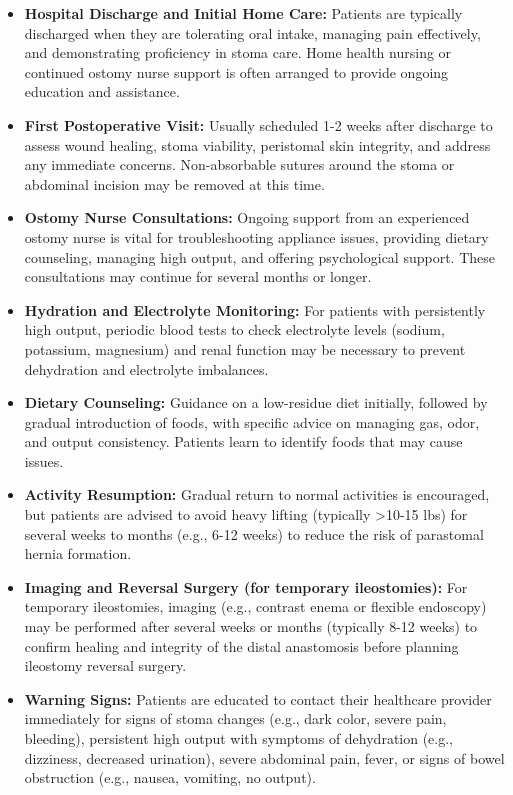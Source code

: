 \begin{itemize}
  \item \textbf{Hospital Discharge and Initial Home Care:} Patients are typically discharged when they are tolerating oral intake, managing pain effectively, and demonstrating proficiency in stoma care. Home health nursing or continued ostomy nurse support is often arranged to provide ongoing education and assistance.
  
  \item \textbf{First Postoperative Visit:} Usually scheduled 1-2 weeks after discharge to assess wound healing, stoma viability, peristomal skin integrity, and address any immediate concerns. Non-absorbable sutures around the stoma or abdominal incision may be removed at this time.
  
  \item \textbf{Ostomy Nurse Consultations:} Ongoing support from an experienced ostomy nurse is vital for troubleshooting appliance issues, providing dietary counseling, managing high output, and offering psychological support. These consultations may continue for several months or longer.
  
  \item \textbf{Hydration and Electrolyte Monitoring:} For patients with persistently high output, periodic blood tests to check electrolyte levels (sodium, potassium, magnesium) and renal function may be necessary to prevent dehydration and electrolyte imbalances.
  
  \item \textbf{Dietary Counseling:} Guidance on a low-residue diet initially, followed by gradual introduction of foods, with specific advice on managing gas, odor, and output consistency. Patients learn to identify foods that may cause issues.
  
  \item \textbf{Activity Resumption:} Gradual return to normal activities is encouraged, but patients are advised to avoid heavy lifting (typically >10-15 lbs) for several weeks to months (e.g., 6-12 weeks) to reduce the risk of parastomal hernia formation.
  
  \item \textbf{Imaging and Reversal Surgery (for temporary ileostomies):} For temporary ileostomies, imaging (e.g., contrast enema or flexible endoscopy) may be performed after several weeks or months (typically 8-12 weeks) to confirm healing and integrity of the distal anastomosis before planning ileostomy reversal surgery.
  
  \item \textbf{Warning Signs:} Patients are educated to contact their healthcare provider immediately for signs of stoma changes (e.g., dark color, severe pain, bleeding), persistent high output with symptoms of dehydration (e.g., dizziness, decreased urination), severe abdominal pain, fever, or signs of bowel obstruction (e.g., nausea, vomiting, no output).
\end{itemize}

